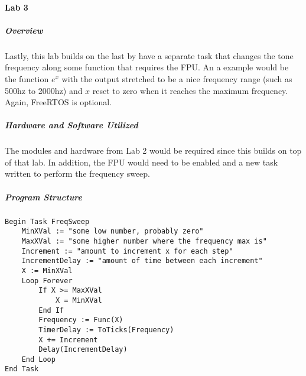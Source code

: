 \documentclass{article}
\begin{document}
\paragraph{Lab 3}
\subparagraph{Overview}
Lastly, this lab builds on the last by have a separate task that changes the tone frequency along some function that requires the 
FPU. An a example would be the function $e^x$ with the output stretched to be a nice frequency range (such as 500hz to 2000hz) and 
$x$ reset to zero when it reaches the maximum frequency. Again, FreeRTOS is optional.
\subparagraph{Hardware and Software Utilized}
The modules and hardware from Lab 2 would be required since this builds on top of that lab. In addition, the FPU would need to 
be enabled and a new task written to perform the frequency sweep.
\subparagraph{Program Structure}
\begin{verbatim}
Begin Task FreqSweep
    MinXVal := "some low number, probably zero"
    MaxXVal := "some higher number where the frequency max is"
    Increment := "amount to increment x for each step"
    IncrementDelay := "amount of time between each increment"
    X := MinXVal
    Loop Forever
        If X >= MaxXVal
            X = MinXVal
        End If
        Frequency := Func(X)
        TimerDelay := ToTicks(Frequency)
        X += Increment
        Delay(IncrementDelay)
    End Loop
End Task
\end{verbatim}
\end{document}
